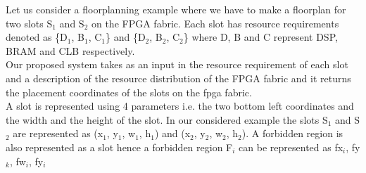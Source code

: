 Let us consider a floorplanning example where we have to make a floorplan for two slots S$_1$ and S$_2$ on the FPGA fabric. Each slot has resource requirements denoted as \{D$_1$, B$_1$, C$_1$\} and \{D$_2$, B$_2$, C$_2$\} where D, B and C represent DSP, BRAM and CLB respectively. \\ Our proposed system takes as an input in the resource requirement of each slot and a description of the resource distribution of the FPGA fabric and it returns the placement coordinates of the slots on the fpga fabric. \\
A slot is represented using 4 parameters i.e. the two bottom left coordinates and the width and the height of the slot. In our considered example the slots S$_1$ and S$_2$ are represented as (x$_1$, y$_1$, w$_1$, h$_1$) and (x$_2$, y$_2$, w$_2$, h$_2$). A forbidden region is also represented as a slot hence a forbidden region F$_i$ can be represented as {fx$_i$, fy$_k$, fw$_i$, fy$_i$}  \\ 



